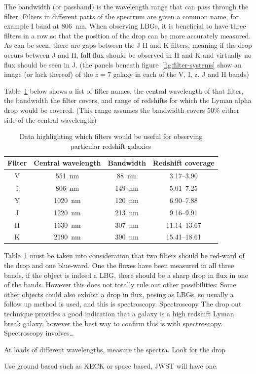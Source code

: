		The bandwidth (or passband) is the wavelength range that can pass through the filter. Filters in different parts of the spectrum are given a common name, for example I band at \SI{806}{\nano\metre}. When observing LBGs, it is beneficial to have three filters in a row so that the position of the drop can be more accurately measured. As can be seen, there are gaps between the J H and K filters, meaning if the drop occurs between J and H, full flux should be observed in H and K and virtually no flux should be seen in J. (the panels beneath figure~\ref{fig:filter-systems} show an image (or lack thereof) of the $z=7$ galaxy in each of the V, I, z, J and H bands)

		Table~\ref{tab:filter_characteristics} below shows a list of filter names, the central wavelength of that filter, the bandwidth the filter covers, and range of redshifts for which the Lyman alpha drop would be covered. (This  range assumes the bandwidth covers 50\% either side of the central wavelength)
		\begin{table}[ht]
			\begin{center}
				\begin{tabular}{c|c|c|c}
					Filter 	& Central wavelength & Bandwidth & Redshift coverage \\
					\hline \hline
					V 	& \SI{551}{\nano\metre}	 & \SI{88}{\nano\metre} & 3.17--3.90 \\
					i 	& \SI{806}{\nano\metre}	 & \SI{149}{\nano\metre} & 5.01--7.25 \\
					Y 	& \SI{1020}{\nano\metre} & \SI{120}{\nano\metre} & 6.90--7.88 \\
					J 	& \SI{1220}{\nano\metre} & \SI{213}{\nano\metre} & 9.16--9.91 \\
					H 	& \SI{1630}{\nano\metre} & \SI{307}{\nano\metre} & 11.14--13.67 \\
					K 	& \SI{2190}{\nano\metre} & \SI{390}{\nano\metre} & 15.41--18.61
				\end{tabular}
			\end{center}
			\caption{Data highlighting which filters would be useful for observing particular redshift galaxies\cite{Galactic_Astronomy_Binney_Merrifield}}
			\label{tab:filter_characteristics}
		\end{table}

		Table~\ref{tab:filter_characteristics} must be taken into consideration that two filters should be red-ward of the drop and one blue-ward. One the fluxes have been measured in all three bands, if the object is indeed a LBG, there should be a sharp drop in flux in  one of the bands. However this does not totally rule out other possibilities: Some other objects could also exhibit a drop in flux, posing as LBGs, so usually a follow up method is used, and this is spectroscopy. Spectroscopy The drop out technique provides a good indication that a galaxy is a high redshift Lyman break galaxy, however the best way to confirm this is with spectroscopy. Spectroscopy involves\ldots

		At loads of different wavelengths, measure the spectra. Look for the drop

		Use ground based such as KECK or space based, JWST will have one.



